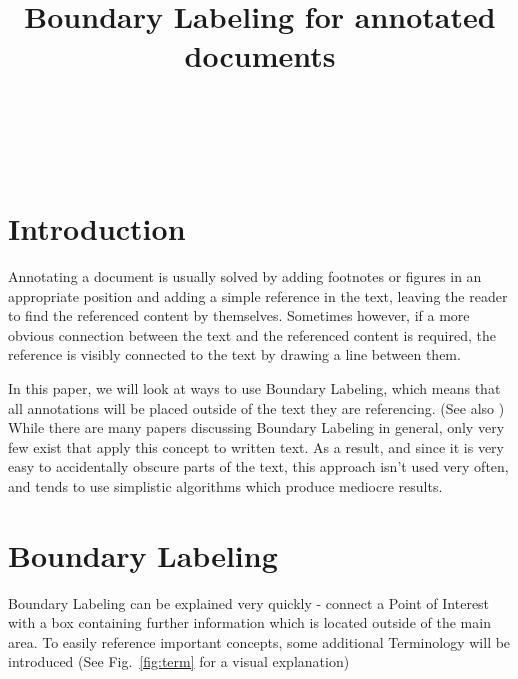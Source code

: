 \documentclass[11pt,a4paper]{article}
\title{Boundary Labeling for annotated documents}%
\author{
 \authorname{Jakob Klinger} \\
 \studentnumber{1125755} \\
 \curriculum{033 534} \\
 \email{e1125755@student.tuwien.ac.at}
}
\begin{document}
\maketitle


\section{Introduction}
Annotating a document is usually solved by adding footnotes or figures in an appropriate position and adding a simple reference in the text, leaving the reader to find the referenced content by themselves. Sometimes however, if a more obvious connection between the text and the referenced content is required, the reference is visibly connected to the text by drawing a line between them.

In this paper, we will look at ways to use Boundary Labeling, which means that all annotations will be placed outside of the text they are referencing. (See also \cite{Bekos2007}) While there are many papers discussing Boundary Labeling in general, only very few exist that apply this concept to written text. As a result, and since it is very easy to accidentally obscure parts of the text, this approach isn't used very often, and tends to use simplistic algorithms which produce mediocre results.


\section{Boundary Labeling}
Boundary Labeling can be explained very quickly -  connect a Point of Interest with a box containing further information which is located outside of the main area. To easily reference important concepts, some additional Terminology will be introduced (See Fig.~\ref{fig:term} for a visual explanation)
\end{document}
